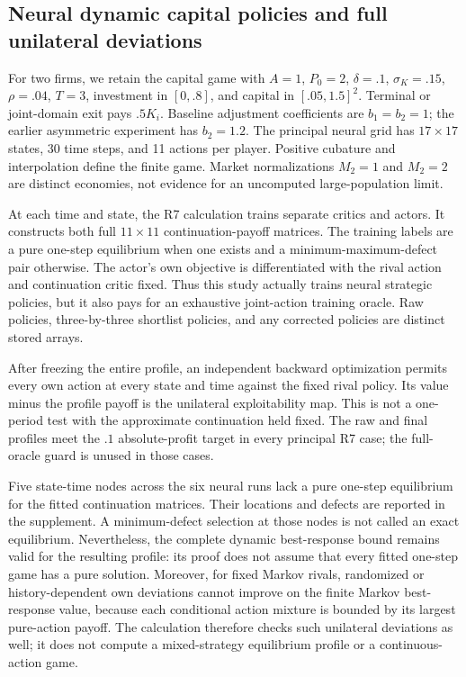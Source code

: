 \subsection{Neural dynamic capital policies and full unilateral deviations}\label{sec:dynamic-computation}
For two firms, we retain the capital game with $A=1$, $P_0=2$, $\delta=.1$, $\sigma_K=.15$, $\rho=.04$, $T=3$, investment in $[0,.8]$, and capital in $[.05,1.5]^2$. Terminal or joint-domain exit pays $.5K_i$. Baseline adjustment coefficients are $b_1=b_2=1$; the earlier asymmetric experiment has $b_2=1.2$. The principal neural grid has $17\times17$ states, 30 time steps, and 11 actions per player. Positive cubature and interpolation define the finite game. Market normalizations $M_2=1$ and $M_2=2$ are distinct economies, not evidence for an uncomputed large-population limit.

At each time and state, the R7 calculation trains separate critics and actors. It constructs both full $11\times11$ continuation-payoff matrices. The training labels are a pure one-step equilibrium when one exists and a minimum-maximum-defect pair otherwise. The actor's own objective is differentiated with the rival action and continuation critic fixed. Thus this study actually trains neural strategic policies, but it also pays for an exhaustive joint-action training oracle. Raw policies, three-by-three shortlist policies, and any corrected policies are distinct stored arrays.

After freezing the entire profile, an independent backward optimization permits every own action at every state and time against the fixed rival policy. Its value minus the profile payoff is the unilateral exploitability map. This is not a one-period test with the approximate continuation held fixed. The raw and final profiles meet the $.1$ absolute-profit target in every principal R7 case; the full-oracle guard is unused in those cases.

Five state-time nodes across the six neural runs lack a pure one-step equilibrium for the fitted continuation matrices. Their locations and defects are reported in the supplement. A minimum-defect selection at those nodes is not called an exact equilibrium. Nevertheless, the complete dynamic best-response bound remains valid for the resulting profile: its proof does not assume that every fitted one-step game has a pure solution. Moreover, for fixed Markov rivals, randomized or history-dependent own deviations cannot improve on the finite Markov best-response value, because each conditional action mixture is bounded by its largest pure-action payoff. The calculation therefore checks such unilateral deviations as well; it does not compute a mixed-strategy equilibrium profile or a continuous-action game.

